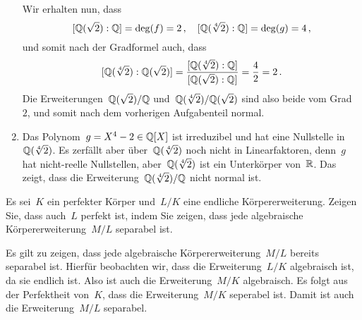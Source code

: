 \documentclass{scrartcl}
\begin{document}
\begin{solution}
\begin{enumerate}
      Wir erhalten nun, dass
      \[
        [\mathbb{Q}(\sqrt{2}) : \mathbb{Q}]
        =
        \deg(f)
        =
        2 \,,
        \quad
        [\mathbb{Q}(\sqrt[4]{2}) : \mathbb{Q}]
        =
        \deg(g)
        =
        4 \,,
      \]
      und somit nach der Gradformel auch, dass
      \[
        [\mathbb{Q}(\sqrt[4]{2}) : \mathbb{Q}(\sqrt{2})]
        =
        \frac{ [\mathbb{Q}(\sqrt[4]{2}) : \mathbb{Q}] }{ [\mathbb{Q}(\sqrt{2}) : \mathbb{Q}] }
        =
        \frac{4}{2}
        =
        2 \,.
      \]
      Die Erweiterungen~$\mathbb{Q}(\sqrt{2}) / \mathbb{Q}$ und~$\mathbb{Q}(\sqrt[4]{2}) / \mathbb{Q}(\sqrt{2})$ sind also beide vom Grad~$2$, und somit nach dem vorherigen Aufgabenteil normal.
    \item
      Das Polynom~$g = X^4 - 2 \in \mathbb{Q}[X]$ ist irreduzibel und hat eine Nullstelle in~$\mathbb{Q}(\sqrt[4]{2})$.
      Es zerfällt aber über~$\mathbb{Q}(\sqrt[4]{2})$ noch nicht in Linearfaktoren, denn~$g$ hat nicht-reelle Nullstellen, aber~$\mathbb{Q}(\sqrt[4]{2})$ ist ein Unterkörper von~$\mathbb{R}$.
      Das zeigt, dass die Erweiterung~$\mathbb{Q}(\sqrt[4]{2}) / \mathbb{Q}$ nicht normal ist.
  \end{enumerate}
\end{solution}

\begin{exercise}
  Es sei~$K$ ein perfekter Körper und~$L/K$ eine endliche Körpererweiterung.
  Zeigen Sie, dass auch~$L$ perfekt ist, indem Sie zeigen, dass jede algebraische Körpererweiterung~$M/L$ separabel ist.
\end{exercise}

\begin{solution}
  Es gilt zu zeigen, dass jede algebraische Körpererweiterung~$M/L$ bereits separabel ist.
  Hierfür beobachten wir, dass die Erweiterung~$L/K$ algebraisch ist, da sie endlich ist.
  Also ist auch die Erweiterung~$M/K$ algebraisch.
  Es folgt aus der Perfektheit von~$K$, dass die Erweiterung~$M/K$ seperabel ist.
  Damit ist auch die Erweiterung~$M/L$ separabel.
\end{solution}





\clearpage





\printsolutions
\end{document}

